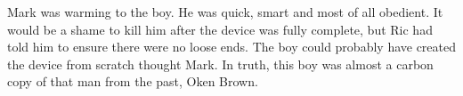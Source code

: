 Mark was warming to the boy.  He was quick, smart and most of all obedient.  It would be a shame to kill him after the device was fully complete, but Ric had told him to ensure there were no loose ends.  The boy could probably have created the device from scratch thought Mark.  In truth, this boy was almost a carbon copy of that man from the past, Oken Brown.





